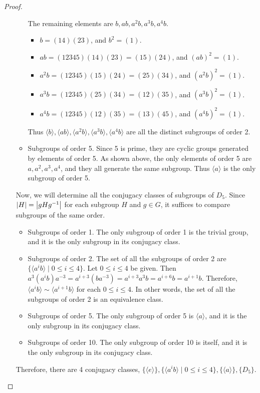 \documentclass[12pt, psamsfonts]{amsart}
\theoremstyle{definition}
\theoremstyle{remark}
\numberwithin{equation}{section}
\begin{document}
\begin{proof}
\begin{enumerate}
\begin{itemize}
           The remaining elements are $b, ab, a^2b, a^3b, a^4b$.
           \begin{itemize}
             \item
               $b = (14)(23)$, and $b^2 = (1)$.
             \item
               $ab = (12345)(14)(23) = (15)(24)$, and $(ab)^2 = (1)$.
             \item
               $a^2b = (12345)(15)(24) = (25)(34)$, and $(a^2b)^2 = (1)$.
             \item
               $a^3b = (12345)(25)(34) = (12)(35)$, and $(a^3b)^2 = (1)$.
             \item
               $a^4b = (12345)(12)(35) = (13)(45)$, and $(a^4b)^2 = (1)$.
           \end{itemize}
           Thus $\langle b \rangle, \langle ab \rangle, \langle a^2b \rangle, \langle a^3b \rangle, \langle a^4b \rangle$ are all the distinct subgroups of order 2.
         \item
           Subgroups of order 5.
           Since 5 is prime, they are cyclic groups generated by elements of order 5.
           As shown above, the only elements of order 5 are $a, a^2, a^3, a^4$, and they all generate the same subgroup.
           Thus $\langle a \rangle$ is the only subgroup of order 5.
       \end{itemize}
       Now, we will determine all the conjugacy classes of subgroups of $D_5$.
       Since $\abs{H} = \abs{gHg^{-1}}$ for each subgroup $H$ and $g \in G$, it suffices to compare subgroups of the same order.
       \begin{itemize}
         \item
           Subgroups of order 1.
           The only subgroup of order 1 is the trivial group, and it is the only subgroup in its conjugacy class.
         \item
           Subgroups of order 2.
           The set of all the subgroups of order 2 are $\{ \langle a^ib \rangle \mid 0 \leq i \leq 4 \}$.
           Let $0 \leq i \leq 4$ be given.
           Then $a^3(a^ib)a^{-3} = a^{i + 3}(ba^{-3}) = a^{i + 3}a^{3}b = a^{i + 6}b = a^{i + 1}b$.
           Therefore, $\langle a^ib \rangle \sim \langle a^{i + 1}b \rangle$ for each $0 \leq i \leq 4$.
           In other words, the set of all the subgroups of order 2 is an equivalence class.
         \item
           Subgroups of order 5.
           The only subgroup of order 5 is $\langle a \rangle$, and it is the only subgroup in its conjugacy class.
         \item
           Subgroups of order 10.
           The only subgroup of order 10 is itself, and it is the only subgroup in its conjugacy class.
       \end{itemize}
       Therefore, there are 4 conjugacy classes, $\{ \langle e \rangle \}, \{ \langle a^ib \rangle \mid 0 \leq i \leq 4 \}, \{ \langle a \rangle \}, \{ D_5 \}$.
  \end{enumerate}
\end{proof}
\end{document}
